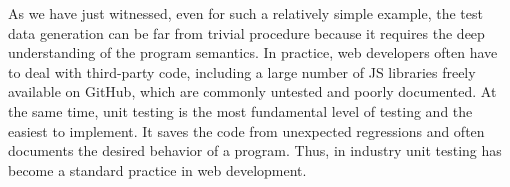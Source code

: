 As we have just witnessed, even for such a relatively simple example, the test data generation can be far from trivial procedure because it requires the deep understanding of the program semantics. In practice, web developers often have to deal with third-party code, including a large number of JS libraries freely available on GitHub, which are commonly untested and poorly documented. At the same time, unit testing is the most fundamental level of testing and the easiest to implement. It saves the code from unexpected regressions and often documents the desired behavior of a program. Thus, in industry unit testing has become a standard practice in web development.
